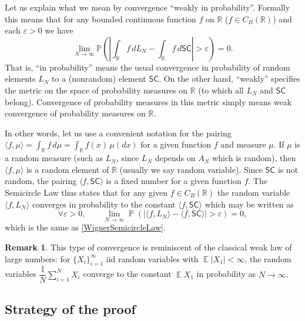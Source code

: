 \documentclass[letterpaper,11pt,oneside,reqno]{amsart}
\numberwithin{equation}{section}
\newcounter{lecture}
\newcommand{\lect}[1]{\bigskip\addtocounter{lecture}{1}\noindent{\Large{\color{red}\bf{}Lecture \#\arabic{lecture} on #1 \hrulefill}}}
\newcommand{\SC}{\mathsf{SC}}
\DeclareMathOperator{\EE}{\mathbb{E}}
\DeclareMathOperator{\PP}{\mathbb{P}}
\theoremstyle{definition}
\newtheorem{remark}[proposition]{Remark}
\begin{document}
Let us explain what we mean by convergence ``weakly in probability''. Formally this means that
for any bounded continuous function $f$ on $\mathbb R$ ($f\in C_B(\mathbb R)$) and each $\varepsilon>0$ we have 
\begin{equation}\label{WignerSemicircleLaw}
\lim_{N\to\infty}\mathbb P\left(\left|\int_{\mathbb R} f\,dL_N-\int_{\mathbb R} f\,d\SC\right|>\varepsilon\right)=0.
\end{equation}
That is, ``in probability'' means the usual convergence in probability  of
random elements $L_N$ to a (nonrandom) element $\SC$.  On the other hand,
``weakly'' specifies the metric on the space of probability measures on
$\mathbb{R}$ (to which all $L_N$ and $\SC$ belong). Convergence of probability
measures in this metric simply means weak convergence of probability measures
on $\mathbb{R}$.

In other words,
let us use a convenient notation for the pairing $\langle f,\mu\rangle
=\int_{\mathbb R} f\,d\mu=\int_{\mathbb R}f(x)\,\mu(dx)$ for a given
function $f$ and measure $\mu$.  If $\mu$ is a random measure (such as $L_N$,
since $L_N$ depends on $A_N$ which is random), then $\langle f,\mu\rangle$ is
a random element of $\mathbb R$ (usually we say random variable).  Since $\SC$
is not random, the pairing $\langle f,\SC\rangle$ is a fixed number for a given function $f$.  The
Semicircle Law thus states that for any given $f\in C_B(\mathbb R)$ the random variable
$\langle f,L_N\rangle$ converges in probability to the constant $\langle f,\SC\rangle$ which may be written as
\begin{equation}\label{WignerSemicircleLaw_langle}
\forall \varepsilon>0,\qquad \lim_{N\to\infty}\PP\left(\left|\langle f,L_N\rangle-\langle f,\SC\rangle\right|>\varepsilon\right)=0,
\end{equation}
which is the same as \eqref{WignerSemicircleLaw}.

\begin{remark}
	This type of convergence is reminiscent of the classical weak law of large numbers: for
	$\{X_i\}_{i=1}^\infty$ iid random variables with $\EE|X_1| <\infty$, the random
	variables $\dfrac{1}N\sum_{i=1}^N X_i$ converge to the constant $\EE X_1$ in probability as $N\to\infty$.
\end{remark}


\lect{1/25/2016}

\subsection{Strategy of the proof} %
\label{sub:strategy_of_the_proof}
\end{document}
